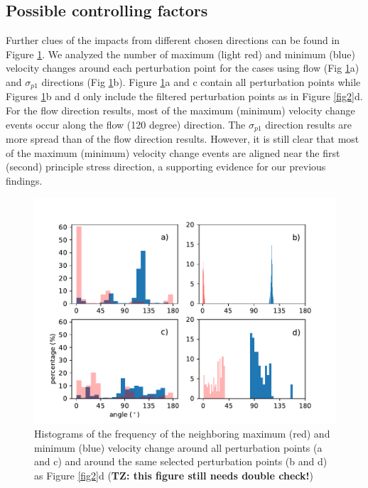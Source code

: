 \documentclass[review,oneside]{igs}
\begin{document}
\subsection{Possible controlling factors}
Further clues of the impacts from different chosen directions can be found in Figure \ref{fig4}. We analyzed the number of maximum (light red) and minimum (blue) velocity changes around each perturbation point for the cases using flow (Fig \ref{fig4}a) and $\sigma_{p1}$ directions (Fig \ref{fig4}b). Figure \ref{fig4}a and c contain all perturbation points while Figures \ref{fig4}b and d only include the filtered perturbation points as in Figure \ref{fig2}d. For the flow direction results, most of the maximum (minimum) velocity change events occur along the flow (120 degree) direction. The $\sigma_{p1}$ direction results are more spread than of the flow direction results. However, it is still clear that most of the maximum (minimum) velocity change events are aligned near the first (second) principle stress direction, a supporting evidence for our previous findings.

\begin{figure}
	\centering
    \includegraphics[width=1\linewidth]{figs/fig4.pdf}
    \caption{Histograms of the frequency of the neighboring maximum (red) and minimum (blue) velocity change around all perturbation points (a and c) and around the same selected perturbation points (b and d) as Figure \ref{fig2}d ({\bf{TZ: this figure still needs double check!}})}
	\label{fig4}
\end{figure}
\end{document}
